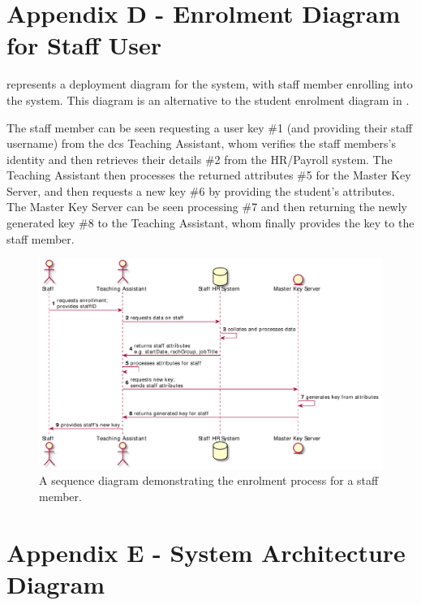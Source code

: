 \begin{appendices}
\section{Appendix D - Enrolment Diagram for Staff User}
\label{appendix:enrolment_diagram}

 represents a deployment diagram for the \theResServer system, with staff member enrolling into the system. This diagram is an alternative to the student enrolment diagram in .

The staff member can be seen requesting a user key \#1 (and providing their staff username) from the \acrshort{dcs} Teaching Assistant, whom verifies the staff members's identity and then retrieves their details \#2 from the HR/Payroll system. The Teaching Assistant then processes the returned attributes \#5 for the Master Key Server, and then requests a new key \#6 by providing the student's attributes. The Master Key Server can be seen processing \#7 and then returning the newly generated key \#8 to the Teaching Assistant, whom finally provides the key to the staff member.

\begin{figure}[htp]
    \centering
    \label{fig:appendix_sta_deployment}
    \includegraphics[width=\linewidth,keepaspectratio]{appendices/diagrams/flow_of_info/enrollment_sta_sequence.pdf}

    \caption{A sequence diagram demonstrating the enrolment process for a staff member.}

\end{figure}

\section{Appendix E - System Architecture Diagram}
\label{appendix:architecture_diagram}


\end{appendices}
